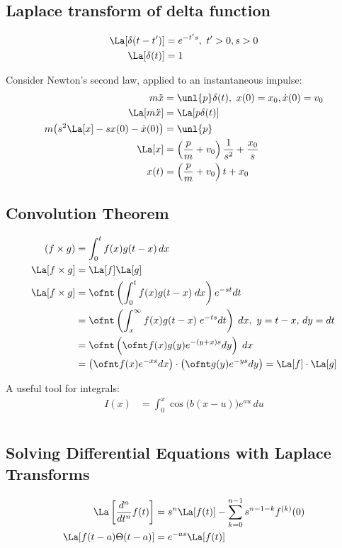 \documentclass[cplx.tex]{subfiles}
\begin{document}
\section{Laplace transform of delta function}
\begin{align}
    \La[\delta(t-t')] &= e^{-t's},~ t'>0,s> 0 \\
    \La[\delta(t)] &= 1 
\end{align}

Consider Newton's second law, applied to an instantaneous impulse:
\begin{align}
    m\ddot{x} &= \unl{p}\delta(t),~ x(0)=x_0,\dot{x}(0)=v_0 \\
    \La[m\ddot{x}] &= \La[p\delta(t)] \\
    m\big(s^2\La[x] - sx(0) - \dot{x}(0)\big) &= \unl{p} \\
    \La[x] &= \left(\frac{p}{m} + v_0\right)\frac{1}{s^2} + \frac{x_0}{s} \\
    x(t) &= \left(\frac{p}{m} + v_0\right)t + x_0
\end{align}

\section{Convolution Theorem}
\begin{align}
    (f\times g) &= \int_0^t f(x)g(t-x)\,dx \\
    \La[f\times g] &= \La[f]\La[g] \\
    \La[f\times g] &= \ofnt \left(\int_0^t f(x)g(t-x)\;dx\right) e^{-st}dt \\
                   &= \ofnt \left(\int_x^\infty f(x)g(t-x)\;e^{-ts}dt\right)\;dx,~ y=t-x,\,dy=dt \\
                   &= \ofnt \left(\ofnt f(x)g(y)e^{-(y+x)s}dy\right)\; dx \\
                   &= \left(\ofnt f(x)e^{-xs}dx\right)\cdot \left(\ofnt g(y)e^{-ys}dy\right) = \La[f]\cdot\La[g]
\end{align}

A useful tool for integrals:
\begin{align}
    I(x) &= \int_0^x \cos\big(b(x-u)\big)e^{au}\,du
\end{align}

\chapter{}
\section{Solving Differential Equations with Laplace Transforms}
\begin{align}
    \La\left[\frac{d^n}{dt^n}f(t)\right] &= s^n\La[f(t)] - \sum_{k=0}^{n-1} s^{n-1-k}f^{(k)}(0) \\
    \La[f(t-a)\Theta(t-a)] &= e^{-as}\La[f(t)]
\end{align}
\end{document}
